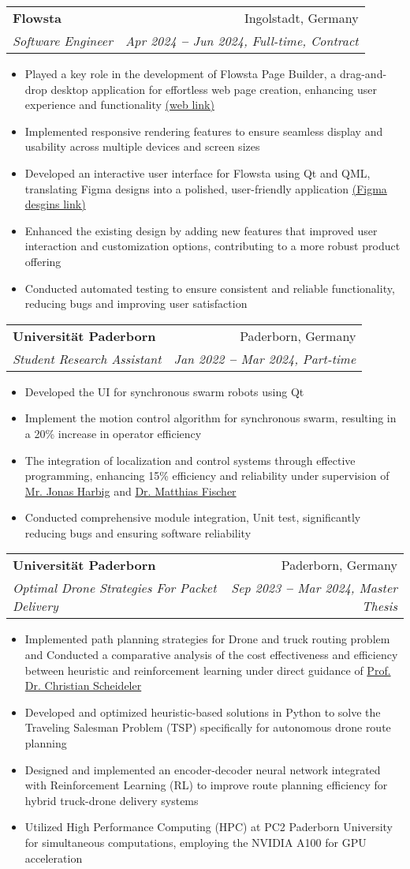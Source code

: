 \documentclass[letterpaper,11pt]{article}
\makeatletter
\newcommand{\resumeItem}[1]{
  \item\small{
    {#1 \vspace{-2pt}}
  }
}
\newcommand{\resumeSubheading}[4]{
  \vspace{-2pt}\item
    \begin{tabular*}{0.97\textwidth}[t]{l@{\extracolsep{\fill}}r}
      \textbf{#1} & #2 \\
      \textit{\small#3} & \textit{\small #4} \\
    \end{tabular*}\vspace{-7pt}
}
\newcommand{\resumeItemListStart}{\begin{itemize}}
\newcommand{\resumeItemListEnd}{\end{itemize}\vspace{-5pt}}
\makeatother
\begin{document}
    \resumeSubheading
      {Flowsta}{Ingolstadt, Germany}
      {Software Engineer}{Apr 2024 \textbf{--} Jun 2024, Full-time, Contract}
        \resumeItemListStart
            \resumeItem{Played a key role in the development of Flowsta Page Builder, a drag-and-drop desktop application for effortless web page creation, enhancing user experience and functionality \href{https://www.flowsta.com}{\color{blue}(web link)}}
            \resumeItem{Implemented responsive rendering features to ensure seamless display and usability across multiple devices and screen sizes}
            \resumeItem{Developed an interactive user interface for Flowsta using Qt and QML, translating Figma designs into a polished, user-friendly application \href{https://www.figma.com/design/250mkmRIFDDwW6ksOnDGld/Flowsta-design?node-id=0-1&p=f}{\color{blue}(Figma desgins link)}}
             \resumeItem{Enhanced the existing design by adding new features that improved user interaction and customization options, contributing to a more robust product offering}
              \resumeItem{Conducted automated testing to ensure consistent and reliable functionality, reducing bugs and improving user satisfaction}
        \resumeItemListEnd

    \resumeSubheading
      {Universität Paderborn}{Paderborn, Germany}
      {Student Research Assistant}{Jan 2022 \textbf{--} Mar 2024, Part-time}
        \resumeItemListStart
         \resumeItem{Developed the UI for synchronous swarm robots using Qt}
            \resumeItem{Implement the motion control algorithm for synchronous swarm, resulting in a 20\% increase in operator efficiency}
            \resumeItem{The integration of localization and control systems through effective programming, enhancing 15\% efficiency and reliability under supervision of \href{https://www.uni-paderborn.de/person/47213}{\color{blue} Mr. Jonas Harbig} and \href{https://www.uni-paderborn.de/en/person/146}{\color{blue} Dr. Matthias Fischer}}
            \resumeItem{Conducted comprehensive module integration, Unit test, significantly reducing bugs and ensuring software reliability}
        \resumeItemListEnd
    
    \resumeSubheading
      {Universität Paderborn}{Paderborn, Germany}
      {Optimal Drone Strategies For Packet Delivery}{Sep 2023 \textbf{--} Mar 2024, Master Thesis}
        \resumeItemListStart
            \resumeItem{Implemented path planning strategies for Drone and truck routing
problem and Conducted a comparative analysis of the cost effectiveness and efficiency between heuristic and reinforcement learning under direct guidance of  \href{https://cs.uni-paderborn.de/en/ti/personal/scheideler}{\color{blue} Prof. Dr. Christian Scheideler}}
            \resumeItem{Developed and optimized heuristic-based solutions in Python to solve the Traveling Salesman Problem (TSP) specifically for autonomous drone route planning}
            \resumeItem{Designed and implemented an encoder-decoder neural network integrated with Reinforcement Learning (RL) to improve route planning efficiency for hybrid truck-drone delivery systems}
            \resumeItem{Utilized High Performance Computing (HPC) at PC2 Paderborn University for simultaneous computations, employing the NVIDIA A100 for GPU acceleration}
        \resumeItemListEnd
    
\end{document}
